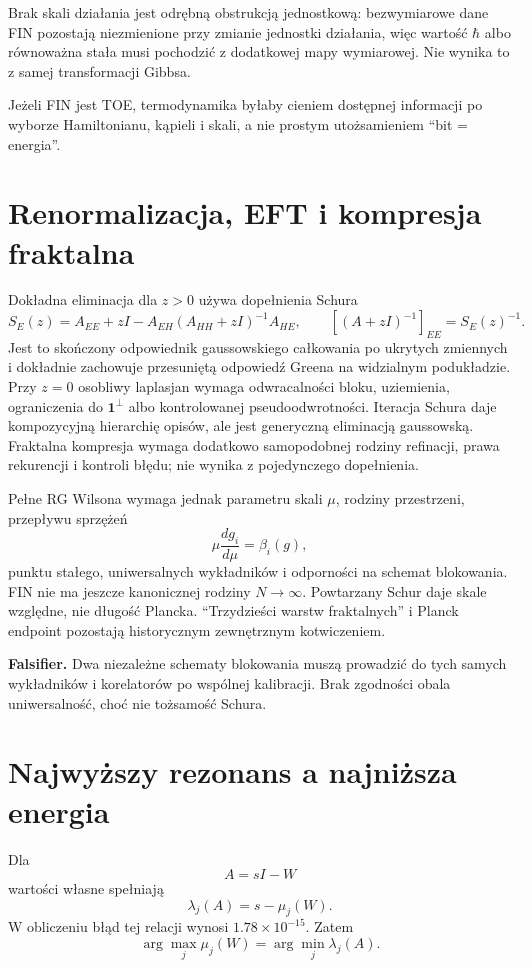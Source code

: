 \documentclass[11pt,a4paper]{article}
\begin{document}
Brak skali działania jest odrębną obstrukcją jednostkową: bezwymiarowe dane FIN pozostają niezmienione przy zmianie jednostki działania, więc wartość $\hbar$ albo równoważna stała musi pochodzić z dodatkowej mapy wymiarowej. Nie wynika to z samej transformacji Gibbsa.

Jeżeli FIN jest TOE, termodynamika byłaby cieniem dostępnej informacji po wyborze Hamiltonianu, kąpieli i skali, a nie prostym utożsamieniem ``bit = energia''.

\section{Renormalizacja, EFT i kompresja fraktalna}

Dokładna eliminacja dla $z>0$ używa dopełnienia Schura
\[
S_E(z)=A_{EE}+zI-A_{EH}(A_{HH}+zI)^{-1}A_{HE},
\qquad [(A+zI)^{-1}]_{EE}=S_E(z)^{-1}.
\]
Jest to skończony odpowiednik gaussowskiego całkowania po ukrytych zmiennych i dokładnie zachowuje przesuniętą odpowiedź Greena na widzialnym podukładzie. Przy $z=0$ osobliwy laplasjan wymaga odwracalności bloku, uziemienia, ograniczenia do $\mathbf1^\perp$ albo kontrolowanej pseudoodwrotności. Iteracja Schura daje kompozycyjną hierarchię opisów, ale jest generyczną eliminacją gaussowską. Fraktalna kompresja wymaga dodatkowo samopodobnej rodziny refinacji, prawa rekurencji i kontroli błędu; nie wynika z pojedynczego dopełnienia.

Pełne RG Wilsona \cite{Wilson} wymaga jednak parametru skali $\mu$, rodziny przestrzeni, przepływu sprzężeń
\[
\mu\frac{dg_i}{d\mu}=\beta_i(g),
\]
punktu stałego, uniwersalnych wykładników i odporności na schemat blokowania. FIN nie ma jeszcze kanonicznej rodziny $N\to\infty$. Powtarzany Schur daje skale względne, nie długość Plancka. ``Trzydzieści warstw fraktalnych'' i Planck endpoint pozostają historycznym zewnętrznym kotwiczeniem.

\textbf{Falsifier.} Dwa niezależne schematy blokowania muszą prowadzić do tych samych wykładników i korelatorów po wspólnej kalibracji. Brak zgodności obala uniwersalność, choć nie tożsamość Schura.

\section{Najwyższy rezonans a najniższa energia}

Dla
\[
A=sI-W
\]
wartości własne spełniają
\[
\lambda_j(A)=s-\mu_j(W).
\]
W obliczeniu błąd tej relacji wynosi $1.78\times10^{-15}$. Zatem
\[
\arg\max_j\mu_j(W)=\arg\min_j\lambda_j(A).
\]
\end{document}
